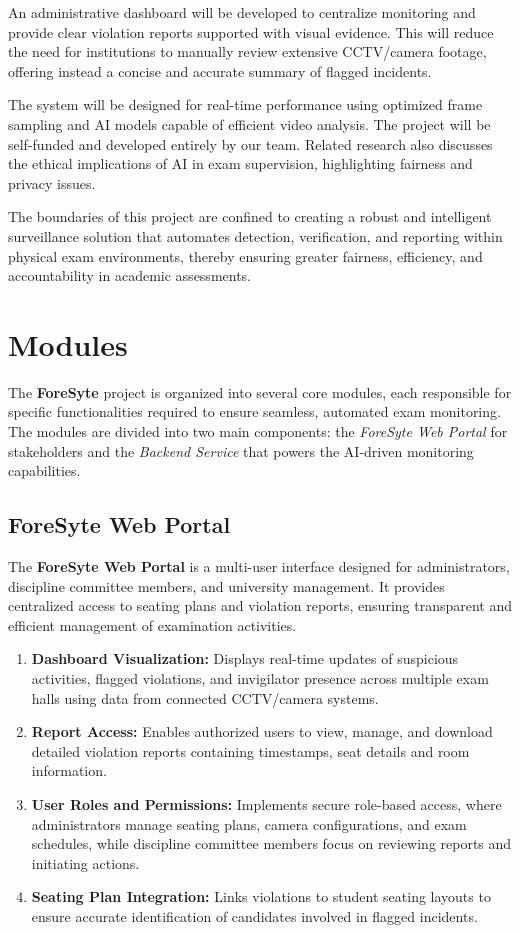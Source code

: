 An administrative dashboard will be developed to centralize monitoring and provide 
clear violation reports supported with visual evidence. This will reduce the need for 
institutions to manually review extensive CCTV/camera footage, offering instead a concise and 
accurate summary of flagged incidents. 

The system will be designed for real-time performance using optimized frame sampling 
and AI models capable of efficient video analysis. The project will be self-funded and 
developed entirely by our team. Related research also discusses the ethical implications of 
AI in exam supervision, highlighting fairness and privacy issues. 

The boundaries of this project are confined to creating a robust and intelligent surveillance 
solution that automates detection, verification, and reporting within physical exam 
environments, thereby ensuring greater fairness, efficiency, and accountability in academic 
assessments.

\section{Modules} 

The \textbf{ForeSyte} project is organized into several core modules, each responsible for specific functionalities required to ensure seamless, automated exam monitoring. 
The modules are divided into two main components: the \textit{ForeSyte Web Portal} for stakeholders and the \textit{Backend Service} that powers the AI-driven monitoring capabilities.

\subsection{ForeSyte Web Portal}
The \textbf{ForeSyte Web Portal} is a multi-user interface designed for administrators, discipline committee members, and university management. 
It provides centralized access to seating plans and violation reports, ensuring transparent and efficient management of examination activities.

\begin{enumerate}
    \setlength{\itemsep}{2pt}
    \item \textbf{Dashboard Visualization:} Displays real-time updates of suspicious activities, flagged violations, and invigilator presence across multiple exam halls using data from connected CCTV/camera systems.
    \item \textbf{Report Access:} Enables authorized users to view, manage, and download detailed violation reports containing timestamps, seat details and room information.
    \item \textbf{User Roles and Permissions:} Implements secure role-based access, where administrators manage seating plans, camera configurations, and exam schedules, while discipline committee members focus on reviewing reports and initiating actions.
    \item \textbf{Seating Plan Integration:} Links violations to student seating layouts to ensure accurate identification of candidates involved in flagged incidents.
\end{enumerate}

